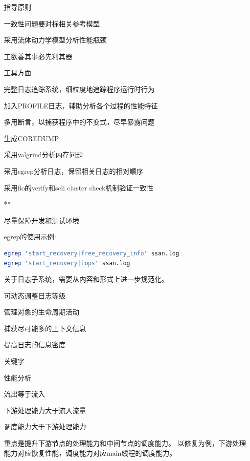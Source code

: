 指导原则
\begin{enumbox}
\item 一致性问题要对标相关参考模型
\item 采用流体动力学模型分析性能瓶颈
\item 工欲善其事必先利其器
\end{enumbox}

工具方面
\begin{enumbox}
\item 完整日志追踪系统，细粒度地追踪程序运行时行为
\item 加入PROFILE日志，辅助分析各个过程的性能特征
\item 多用断言，以捕获程序中的不变式，尽早暴露问题
\item 生成COREDUMP
\item 采用valgrind分析内存问题
\item 采用egrep分析日志，保留相关日志的相对顺序
\item 采用fio的verify和scli cluster check机制验证一致性
\item ***
\item 尽量保障开发和测试环境
\end{enumbox}

egrep的使用示例:
\begin{lstlisting}[language=bash,frame=single]
egrep 'start_recovery|free_recovery_info' ssan.log
egrep 'start_recovery|iops' ssan.log
\end{lstlisting}

关于日志子系统，需要从内容和形式上进一步规范化。
\begin{enumbox}
\item 可动态调整日志等级
\item 管理对象的生命周期活动
\item 捕获尽可能多的上下文信息
\item 提高日志的信息密度
\item 关键字
\end{enumbox}

性能分析
\begin{enumbox}
\item 流出等于流入
\item 下游处理能力大于流入流量
\item 调度能力大于下游处理能力
\end{enumbox}

重点是提升下游节点的处理能力和中间节点的调度能力。
以修复为例，下游处理能力对应恢复性能，调度能力对应main线程的调度能力。
